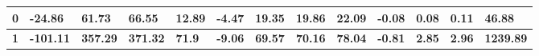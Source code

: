 \documentclass[10pt,a4paper]{article}
\begin{document}
\begin{table}[]
\begin{tabular}{|l|llll|llll|llll|}
\textbf{0}  & \multicolumn{1}{l|}{-24.86}                                                           & \multicolumn{1}{l|}{61.73}                                                             & \multicolumn{1}{l|}{66.55}                                                           & 12.89                                                                                            & \multicolumn{1}{l|}{-4.47}                                                            & \multicolumn{1}{l|}{19.35}                                                             & \multicolumn{1}{l|}{19.86}                                                           & 22.09                                                                                            & \multicolumn{1}{l|}{{\color[HTML]{32CB00} \textbf{-0.08}}}                            & \multicolumn{1}{l|}{{\color[HTML]{32CB00} \textbf{0.08}}}                              & \multicolumn{1}{l|}{{\color[HTML]{32CB00} \textbf{0.11}}}                            & {\color[HTML]{32CB00} \textbf{46.88}}                                                            \\ \hline
\textbf{1}  & \multicolumn{1}{l|}{{\color[HTML]{FE0000} \textbf{-101.11}}}                          & \multicolumn{1}{l|}{{\color[HTML]{FE0000} \textbf{357.29}}}                            & \multicolumn{1}{l|}{{\color[HTML]{FE0000} \textbf{371.32}}}                          & {\color[HTML]{FE0000} \textbf{71.9}}                                                             & \multicolumn{1}{l|}{{\color[HTML]{FE0000} \textbf{-9.06}}}                            & \multicolumn{1}{l|}{{\color[HTML]{FE0000} \textbf{69.57}}}                             & \multicolumn{1}{l|}{{\color[HTML]{FE0000} \textbf{70.16}}}                           & {\color[HTML]{FE0000} \textbf{78.04}}                                                            & \multicolumn{1}{l|}{{\color[HTML]{FE0000} \textbf{-0.81}}}                            & \multicolumn{1}{l|}{{\color[HTML]{FE0000} \textbf{2.85}}}                              & \multicolumn{1}{l|}{{\color[HTML]{FE0000} \textbf{2.96}}}                            & {\color[HTML]{FE0000} \textbf{1239.89}}                                                          \\ \hline

\end{tabular}
\end{table}
\end{document}
